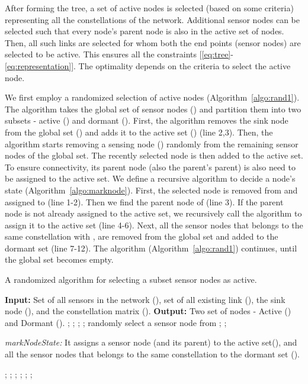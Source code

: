 \documentclass[conference]{IEEEtran}
\begin{document}
After forming the tree, a set of active nodes is selected (based on some criteria) representing all the constellations of the network. Additional sensor nodes can be selected such that every node's parent node is also in the active set of nodes. Then, all such links are selected for whom both the end points (sensor nodes) are selected to be active. This ensures all the constraints [\ref{eq:tree}-\ref{eq:representation}]. The optimality depends on the criteria to select the active node.

We first employ a randomized selection of active nodes (Algorithm~\ref{algo:rand1}). The algorithm takes the global set of sensor nodes () and partition them into two subsets - active () and dormant (). First, the algorithm removes the sink node from the global set () and adds it to the active set () (line 2,3). Then, the algorithm starts removing a sensing node () randomly from the remaining sensor nodes of the global set. The recently selected node is then added to the active set. To ensure connectivity, its parent node (also the parent's parent) is also need to be assigned to the active set. We define a recursive algorithm to decide a node's state (Algorithm~\ref{algo:marknode}). First, the selected node is removed from  and assigned to  (line 1-2). Then we find the parent node of  (line 3). If the parent node is not already assigned to the active set, we recursively call the algorithm to assign it to the active set (line 4-6). Next, all the sensor nodes that belongs to the same constellation with , are removed from the global set and added to the dormant set (line 7-12). The algorithm (Algorithm~\ref{algo:rand1}) continues, until the global set becomes empty.

\begin{algorithm}
\caption{A randomized algorithm for selecting a subset sensor nodes as active.}
\label{algo:rand1}
\begin{algorithmic}[1]
\Statex \textbf{Input:} Set of all sensors in the network (), set of all existing link (), the sink node (), and the constellation matrix ().
\Statex \textbf{Output:} Two set of nodes - Active () and Dormant ().
\State ;
\State ;
\State ;
\State ;
	\State randomly select a sensor node  from ;
	\State ;
\EndWhile
\end{algorithmic}
\end{algorithm}


\begin{algorithm}
\caption{\emph{markNodeState:} It assigns a sensor node (and its parent) to the active set(), and all the sensor nodes that belongs to the same constellation to the dormant set ().}
\label{algo:marknode}
\begin{algorithmic}[1]
\State ;
\State ;
\State ;
	\State ;
\EndIf
{}
		\State ;
		\State ;
	\EndIf 
\EndFor
\end{algorithmic}
\end{algorithm}
\end{document}
